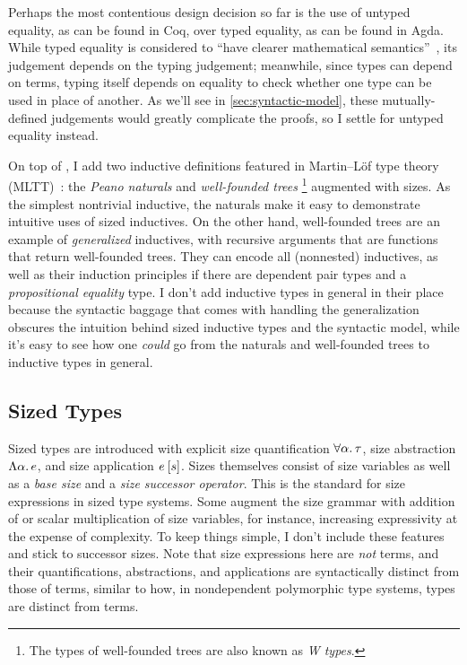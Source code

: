 Perhaps the most contentious design decision so far is the use of untyped equality,
as can be found in Coq, over typed equality, as can be found in Agda.%
While typed equality is considered to ``have clearer mathematical semantics''~\citep{typed-NbE},
its judgement depends on the typing judgement;
meanwhile, since types can depend on terms,
typing itself depends on equality to check whether one type can be used in place of another.
As we'll see in \cref{sec:syntactic-model}, these mutually-defined judgements would greatly complicate the proofs,
so I settle for untyped equality instead.

On top of \GCC, I add two inductive definitions featured in Martin--L\"of type theory (MLTT)~\citep{mltt}:
the \emph{Peano naturals} and \emph{well-founded trees}\punctstack{,}%
\footnote{The types of well-founded trees are also known as \emph{W types}.}
augmented with sizes.
As the simplest nontrivial inductive,
the naturals make it easy to demonstrate intuitive uses of sized inductives.
On the other hand, well-founded trees are an example of \emph{generalized} inductives,
with recursive arguments that are functions that return well-founded trees.
They can encode all (nonnested) inductives,
as well as their induction principles \citep{whynotW} if there are dependent pair types
and a \emph{propositional equality} type.
I don't add inductive types in general in their place
because the syntactic baggage that comes with handling the generalization
obscures the intuition behind sized inductive types and the syntactic model,
while it's easy to see how one \emph{could} go from the naturals and well-founded trees
to inductive types in general.

\subsection{Sized Types}\label{sec:sized-types}

Sized types are introduced with explicit size quantification $\forall \alpha \mathpunct{.} \tau$,
size abstraction $\Lambda \alpha \mathpunct{.} e$, and size application $\App{e}{s}$.
Sizes themselves consist of size variables as well as a \emph{base size}
and a \emph{size successor operator}.
This is the standard for size expressions in sized type systems.
Some augment the size grammar with addition of or scalar multiplication of size variables,
for instance, increasing expressivity at the expense of complexity.
To keep things simple, I don't include these features and stick to successor sizes.
Note that size expressions here are \emph{not} terms,
and their quantifications, abstractions, and applications
are syntactically distinct from those of terms,
similar to how, in nondependent polymorphic type systems,
types are distinct from terms.

